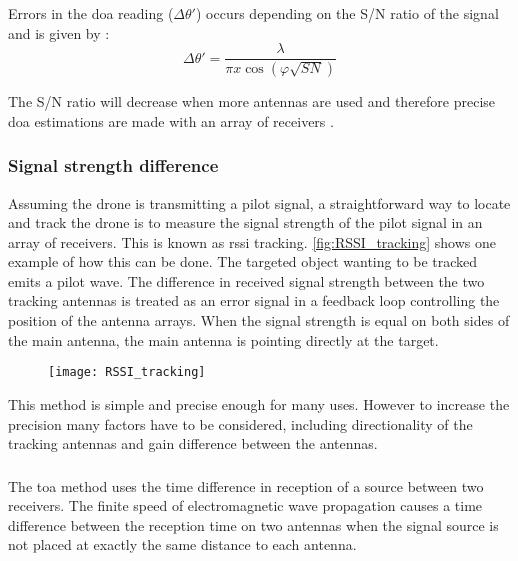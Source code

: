 Errors in the \gls{doa} reading ($\Delta\theta '$) occurs depending on the S/N ratio of the signal and is given by \citep[p. 43]{book:shinohara}:
\begin{equation} \label{doasnerror}
\Delta\theta ' = \frac{\lambda}{\pi x \cos(\varphi \sqrt{SN})} 
\end{equation}

\startexplain
{}
\stopexplain

The S/N ratio will decrease when more antennas are used and therefore precise \gls{doa} estimations are made with an array of receivers \citep{book:shinohara}.

\subsubsection{Signal strength difference}
Assuming the drone is transmitting a pilot signal, 
a straightforward way to locate and track the drone is to measure the signal strength of the pilot signal in an array of receivers. This is known as \gls{rssi} tracking. \autoref{fig:RSSI_tracking} shows one example of how this can be done. The targeted object wanting to be tracked emits a pilot wave. The difference in received signal strength between the two tracking antennas is treated as an error signal in a feedback loop controlling the position of the antenna arrays. When the signal strength is equal on both sides of the main antenna, the main antenna is pointing directly at the target.

\begin{figure}[h]
	\centering
	\texttt{[image: RSSI\_tracking]}
	\caption[Placement of tracking antennas in a \gls{rssi} tracking system]{}
	\label{fig:RSSI_tracking}
\end{figure}

This method is simple and precise enough for many uses. However to increase the precision many factors have to be considered, including directionality of the tracking antennas and gain difference between the antennas. 

\subsubsection{}
The \gls{toa} method uses the time difference in reception of a source between two receivers. The finite speed of electromagnetic wave propagation causes a time difference between the reception time on two antennas when the signal source is not placed at exactly the same distance to each antenna.

